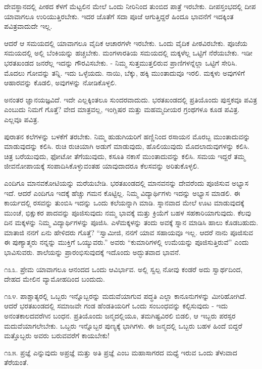 ದೇವಸ್ಥಾನದಲ್ಲಿ ಪೀಠದ ಕೆಳಗೆ ಮೆಟ್ಟಲಿನ ಮೇಲೆ ಒಂದು ನೀರಿನಿಂದ ತುಂಬಿದ ಪಾತ್ರೆ ಇರಬೇಕು. ದೀಪಸ್ತಂಭದಲ್ಲಿ ದೀಪ ಯಾವಾಗಲೂ ಉರಿಯುತ್ತಿರಬೇಕು. ಇದರ ಜೊತೆಗೆ ಸದಾ ಪೂಜೆ ಆಗುತ್ತಿದ್ದರೆ ಹಿಂದೂ ಭಾವನೆಗೆ ಇದಕ್ಕಿಂತ ಪವಿತ್ರವಾದುದೇ ಇಲ್ಲ.

ಆದರೆ ಆ ಸಮಯದಲ್ಲಿ ಯಾವಾಗಲೂ ವೈದಿಕ ಆಚಾರಗಳೇ ಇರಬೇಕು. ಒಂದು ವೈದಿಕ ಪೀಠವಿರಬೇಕು. ಪೂಜೆಯ ಸಮಯದಲ್ಲಿ ಅಲ್ಲಿ ಬೆಂಕಿಯನ್ನು ಹಚ್ಚಬೇಕು. ಮಂಗಳಾರತಿಯ ಸಮಯದಲ್ಲಿ ಮಕ್ಕಳೆಲ್ಲ ಒಟ್ಟಿಗೆ ನೆರೆಯಬೇಕು. ಇಡೀ ಭರತಖಂಡದ ಜನರೆಲ್ಲ ಇದನ್ನು ಗೌರವಿಸಬೇಕು. - ನಿಮ್ಮ ಸುತ್ತಮುತ್ತಲಿರುವ ಪ್ರಾಣಿಗಳನ್ನೆಲ್ಲಾ ಒಟ್ಟಿಗೆ ಸೇರಿಸಿ. ಮೊದಲು ಗೋವನ್ನು ತನ್ನಿ. ಇದು ಒಳ್ಳೆಯದು. ನಾಯಿ, ಬೆಕ್ಕು, ಹಕ್ಕಿ ಮುಂತಾದುವೂ ಇರಲಿ. ಮಕ್ಕಳು ಅವುಗಳಿಗೆ ಆಹಾರವನ್ನು ಕೊಡಲಿ, ಅವುಗಳನ್ನು ನೋಡಿಕೊಳ್ಳಲಿ.

ಅನಂತರ ಜ್ಞಾನಯಜ್ಞವಿದೆ. ಇದೇ ಎಲ್ಲಕ್ಕಿಂತಲೂ ಸುಂದರವಾದುದು. ಭರತಖಂಡದಲ್ಲಿ ಪ್ರತಿಯೊಂದು ಪುಸ್ತಕವೂ ಪವಿತ್ರ ಎಂಬುದು ನಿಮಗೆ ಗೊತ್ತೆ? ವೇದ ಮಾತ್ರವಲ್ಲ, ಇಂಗ್ಲಿಷರ ಮತ್ತು ಮಹಮ್ಮದೀಯರ ಗ್ರಂಥಗಳೂ ಕೂಡ ಪವಿತ್ರ. ಎಲ್ಲವೂ ಪವಿತ್ರ.

ಪುರಾತನ ಕಲೆಗಳನ್ನು ಬಳಕೆಗೆ ತರಬೇಕು. ನಿಮ್ಮ ಹುಡುಗಿಯರಿಗೆ ಹಣ್ಣಿನಿಂದ ರಸಾಯನ ಮೊರಬ್ಬ ಮುಂತಾದುವನ್ನು ಮಾಡುವುದನ್ನು ಕಲಿಸಿ. ರುಚಿ ರುಚಿಯಾಗಿ ಅಡುಗೆ ಮಾಡುವುದು, ಹೊಲಿಯುವುದು ಮೊದಲಾದುವುಗಳನ್ನು ಕಲಿಸಿ. ಚಿತ್ರ ಬರೆಯುವುದು, ಫೋಟೋ ತೆಗೆಯುವುದು, ಕಸೂತಿ ನಕಾಸೆ ಮುಂತಾದುವನ್ನು ಕಲಿಸಿ. ಸಮಯ ಇದ್ದರೆ ತಮ್ಮ ಜೀವನೋಪಾಯಕ್ಕೆ ಸಂಪಾದಿಸಿಕೊಳ್ಳುವಂತಹ ಯಾವುದಾದರೂ ಕೆಲಸವನ್ನು ಅರಿತುಕೊಳ್ಳಲಿ.

ಎಂದಿಗೂ ಮಾನವಕೋಟಿಯನ್ನು ಮರೆಯಬೇಡಿ. ಭರತಖಂಡದಲ್ಲಿ ಮಾನವನನ್ನು ದೇವರೆಂದು ಪೂಜಿಸುವ ಅಭ್ಯಾಸ ಇದೆ. ಆದರೆ ಎಂದಿಗೂ ಇದಕ್ಕೆ ಹೆಚ್ಚು ಗಮನ ಕೊಟ್ಟಿಲ್ಲ. ನಿಮ್ಮ ವಿದ್ಯಾರ್ಥಿಗಳು ಇದನ್ನು ಅಭ್ಯಾಸ ಮಾಡಲಿ. ಈ ಕಾರ್ಯದಲ್ಲಿ ರಸವನ್ನು ತುಂಬಿಸಿ ಇದನ್ನು ಒಂದು ಕಲೆಯನ್ನಾಗಿ ಮಾಡಿ. ಸ್ನಾನವಾದ ಮೇಲೆ ಊಟ ಮಾಡುವುದಕ್ಕೆ ಮುಂಚೆ, ಭಿಕ್ಷುಕರ ಪಾದವನ್ನು ಪೂಜಿಸುವುದು ನಮ್ಮ ಭಾವಕ್ಕೆ ಮತ್ತು ಕ್ರಿಯೆಗೆ ಬಹಳ ಸಹಕಾರಿಯಾಗುವುದು. ಕೆಲವು ದಿನ ಮಕ್ಕಳನ್ನು ನಿಮ್ಮ ವಿದ್ಯಾರ್ಥಿಗಳನ್ನು ಪೂಜಿಸಿ. ಎಳೆಮಕ್ಕಳನ್ನು ತಂದು ಅವಕ್ಕೆ ಸ್ನಾನ ಮಾಡಿಸಿ ಹಾಲು ಕೊಡಬಹುದು. ಮಾತಾಜಿ ನನಗೆ ಏನು ಹೇಳಿದರು ಗೊತ್ತೆ? “ಸ್ವಾಮೀಜಿ, ನನಗೆ ಯಾವ ಸಹಾಯವೂ ಇಲ್ಲ. ಆದರೆ ನಾನು ಪೂಜಿಸುವ ಈ ಪುಣ್ಯಾತ್ಮರು ನನ್ನನ್ನು ಮುಕ್ತಿಗೆ ಒಯ್ಯುವರು.” ಅವರು “ಕುಮಾರಿಗಳಲ್ಲಿ ಉಮೆಯನ್ನು ಪೂಜಿಸುತ್ತಿರುವೆ” ಎಂದು ಭಾವಿಸುವರು. ಶಾಲೆಯನ್ನು ಪ್ರಾರಂಭಿಸುವುದಕ್ಕೆ ಇದೊಂದು ಅದ್ಭುತವಾದ ಭಾವನೆ.

೧೩೩. ಪ್ರೇಮ ಯಾವಾಗಲೂ ಆನಂದದ ಒಂದು ಆವಿರ್ಭಾವ. ಅಲ್ಲಿ ಸ್ವಲ್ಪ ನೋವು ಕಂಡರೆ ಅದು ಸ್ವಾರ್ಥದಿಂದ, ದೇಹದ ಮೇಲಿನ ವ್ಯಾಮೋಹದಿಂದ ಬಂದುದು.

೧೩೪. ಪಾಶ್ಚಾತ್ಯರಲ್ಲಿ ಒಬ್ಬರು ಇನ್ನೊಬ್ಬರನ್ನು ಮದುವೆಯಾಗುವ ಪದ್ಧತಿ ಎಲ್ಲಾ ಕಾನೂನುಗಳನ್ನು ಮೀರಿಹೋಗಿದೆ. ಆದರೆ ಭರತಖಂಡದಲ್ಲಿ ಸಮಾಜವೇ ಗಂಡ ಹೆಂಡತಿಯರಿಗೆ ಒಂದು ಸಂಬಂಧವನ್ನು ಕಲ್ಪಿಸುವುದು - ಇದು ಅನಂತಕಾಲದವರೆಗಿನ ಬಂಧನ. ಪ್ರತಿಯೊಂದು ಜನ್ಮದಲ್ಲಿಯೂ, ತಮಗಿಷ್ಟವಿರಲಿ ಬಿಡಲಿ, ಆ ಇಬ್ಬರು ಪರಸ್ಪರ ಮದುವೆಯಾಗಲೇಬೇಕು. ಒಬ್ಬರು ಇನ್ನೊಬ್ಬರ ಪುಣ್ಯಕ್ಕೆ ಭಾಗಿಗಳು. ಈ ಜನ್ಮದಲ್ಲಿ ಒಬ್ಬರು ಬಹಳ ಹಿಂದೆ ಬಿದ್ದರೆ ಮತ್ತೊಬ್ಬರು ಅವರು ಬರುವವರೆಗೆ ಕಾಯಬೇಕು!

೧೩೫. ಪ್ರಜ್ಞೆ ಎನ್ನುವುದು ಅಪ್ರಜ್ಞೆ  ಮತ್ತು ಅತಿ ಪ್ರಜ್ಞೆ  ಎಂಬ ಮಹಾಸಾಗರದ ಮಧ್ಯೆ ಇರುವ ಒಂದು ತೆಳುವಾದ ತೆರೆಯಂತೆ.


